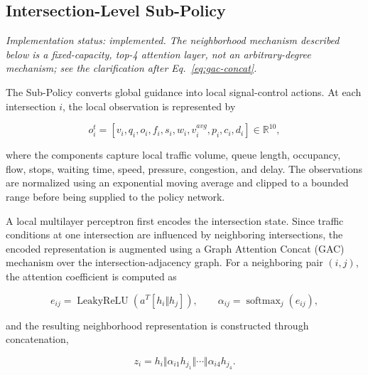 \documentclass[3p,times]{elsarticle}
\theoremstyle{plain}
\theoremstyle{definition}
\begin{document}

\subsection{Intersection-Level Sub-Policy}\label{subsec3-7}

\textit{Implementation status: implemented. The neighborhood mechanism
described below is a fixed-capacity, top-4 attention layer, not an
arbitrary-degree mechanism; see the clarification after
Eq.~\eqref{eq:gac-concat}.}

The Sub-Policy converts global guidance into local signal-control
actions. At each intersection $i$, the local observation is
represented by

\begin{equation}
o_i^t = \left[v_i, q_i, o_i, f_i, s_i, w_i, v_i^{avg}, p_i, c_i,
d_i\right] \in \mathbb{R}^{10},
\end{equation}

where the components capture local traffic volume, queue length,
occupancy, flow, stops, waiting time, speed, pressure, congestion, and
delay. The observations are normalized using an exponential moving
average and clipped to a bounded range before being supplied to the
policy network.

A local multilayer perceptron first encodes the intersection state.
Since traffic conditions at one intersection are influenced by
neighboring intersections, the encoded representation is augmented
using a Graph Attention Concat (GAC) mechanism over the
intersection-adjacency graph. For a neighboring pair $(i, j)$, the
attention coefficient is computed as

\begin{equation}
e_{ij} = \operatorname{LeakyReLU}\!\left(a^{T}[h_i \Vert h_j]\right),
\qquad
\alpha_{ij} = \operatorname{softmax}_j(e_{ij}),
\end{equation}

and the resulting neighborhood representation is constructed through
concatenation,

\begin{equation}
z_i = h_i \Vert \alpha_{i1}h_{j_1} \Vert \cdots \Vert
\alpha_{i4}h_{j_4}.
\label{eq:gac-concat}
\end{equation}
\end{document}
